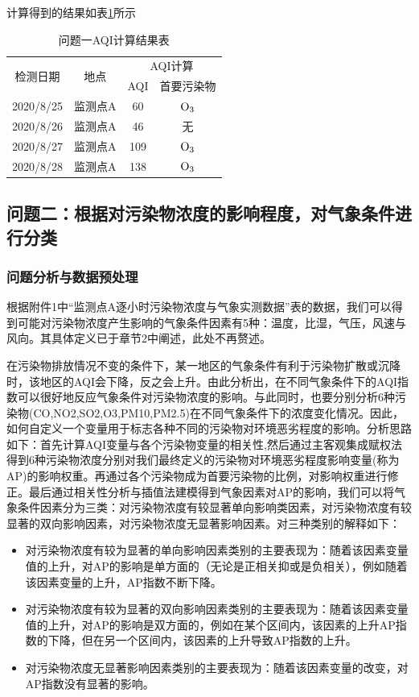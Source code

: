 \documentclass[bwprint]{gmcmthesis}
\numberwithin{figure}{section}
\begin{document}
计算得到的结果如表\ref{tab:table4-3}所示
\begin{table}[h!]
	\caption{问题一AQI计算结果表}\label{tab:table4-3}
	\begin{center}
		\begin{tabular}{|c|c|c|c|}
			\hline
			\multirow{2}{*}{检测日期}&\multirow{2}{*}{地点}&\multicolumn{2}{|c|}{AQI计算} \\
			\cline{3-4}
			& &AQI&首要污染物\\
			\hline
			2020/8/25&监测点A&60&$\rm O_3$\\
			\hline
			2020/8/26&监测点A&46&无\\
			\hline
			2020/8/27&监测点A&109&$\rm O_3$\\
			\hline
			2020/8/28&监测点A&138&$\rm O_3$\\
			\hline
		\end{tabular}
	\end{center}
\end{table}

\subsection{问题二：根据对污染物浓度的影响程度，对气象条件进行分类}
\subsubsection{问题分析与数据预处理}
根据附件1中“监测点A逐小时污染物浓度与气象实测数据”表的数据，我们可以得到可能对污染物浓度产生影响的气象条件因素有5种：温度，比湿，气压，风速与风向。其具体定义已于章节2中阐述，此处不再赘述。

在污染物排放情况不变的条件下，某一地区的气象条件有利于污染物扩散或沉降时，该地区的AQI会下降，反之会上升。由此分析出，在不同气象条件下的AQI指数可以很好地反应气象条件对污染物浓度的影响。与此同时，也要分别分析6种污染物(CO,NO2,SO2,O3,PM10,PM2.5)在不同气象条件下的浓度变化情况。因此，如何自定义一个变量用于标志各种不同的污染物对环境恶劣程度的影响。分析思路如下：首先计算AQI变量与各个污染物变量的相关性,然后通过主客观集成赋权法得到6种污染物浓度分别对我们最终定义的污染物对环境恶劣程度影响变量(称为AP)的影响权重。再通过各个污染物成为首要污染物的比例，对影响权重进行修正。最后通过相关性分析与插值法建模得到气象因素对AP的影响，我们可以将气象条件因素分为三类：对污染物浓度有较显著单向影响类因素，对污染物浓度有较显著的双向影响因素，对污染物浓度无显著影响因素。对三种类别的解释如下：
\begin{itemize}
	\item 对污染物浓度有较为显著的单向影响因素类别的主要表现为：随着该因素变量值的上升，对AP的影响是单方面的（无论是正相关抑或是负相关），例如随着该因素变量的上升，AP指数不断下降。
	\item 对污染物浓度有较为显著的双向影响因素类别的主要表现为：随着该因素变量值的上升，对AP的影响是双方面的，例如在某个区间内，该因素的上升AP指数的下降，但在另一个区间内，该因素的上升导致AP指数的上升。
	\item 对污染物浓度无显著影响因素类别的主要表现为：随着该因素变量的改变，对AP指数没有显著的影响。
\end{itemize}
\end{document}
